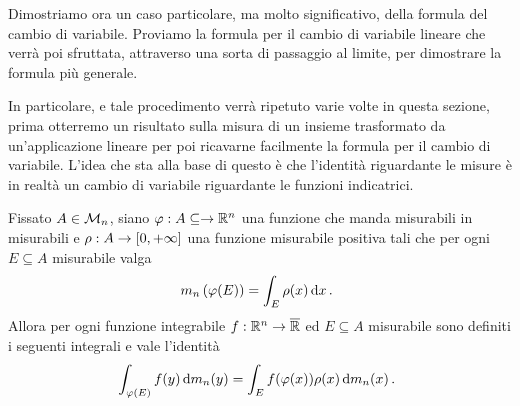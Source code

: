 Dimostriamo ora un caso particolare, ma molto significativo, della formula del cambio di variabile. 
Proviamo la formula per il cambio di variabile lineare che verrà poi sfruttata, attraverso una sorta di passaggio al limite, per dimostrare la formula più generale.

In particolare, e tale procedimento verrà ripetuto varie volte in questa sezione, prima otterremo un risultato sulla misura di un insieme trasformato da un'applicazione lineare per poi ricavarne facilmente la formula per il cambio di variabile. L'idea che sta alla base di questo è che l'identità riguardante le misure è in realtà un cambio di variabile riguardante le funzioni indicatrici.

\begin{proposition}\label{prop:IdentitaMisuraImplicaCambioVariabile}
	Fissato $A\in\mathcal M_n$, siano $\varphi:A\subseteq\to\mathbb R^n$ una funzione che manda misurabili in misurabili e $\rho:A\to[0,+\infty]$ una funzione misurabile positiva tali che per ogni $E\subseteq A$ misurabile valga
	\begin{equation*}
		m_n\left(\varphi(E)\right)=\int_E\rho(x)\,\mathrm d x \, \text{. }
	\end{equation*}
	Allora per ogni funzione integrabile $f:\mathbb R^n\to\overline{\mathbb R}$ ed $E\subseteq A$ misurabile sono definiti i seguenti integrali e vale l'identità
	\begin{equation*}
		\int_{\varphi(E)}f(y)\,\mathrm d m_n(y)=\int_E f(\varphi(x))\rho(x)\,\mathrm d m_n(x)\, \text{. }
	\end{equation*}
\end{proposition}
